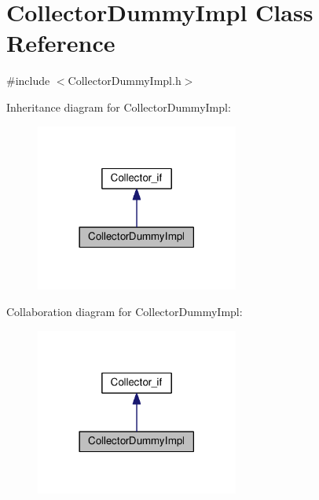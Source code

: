 \hypertarget{class_collector_dummy_impl}{}\section{Collector\+Dummy\+Impl Class Reference}
\label{class_collector_dummy_impl}


{\ttfamily \#include $<$Collector\+Dummy\+Impl.\+h$>$}



Inheritance diagram for Collector\+Dummy\+Impl\+:
\nopagebreak
\begin{figure}[H]
\begin{center}
\leavevmode
\includegraphics[width=189pt]{class_collector_dummy_impl__inherit__graph}
\end{center}
\end{figure}


Collaboration diagram for Collector\+Dummy\+Impl\+:
\nopagebreak
\begin{figure}[H]
\begin{center}
\leavevmode
\includegraphics[width=189pt]{class_collector_dummy_impl__coll__graph}
\end{center}
\end{figure}
